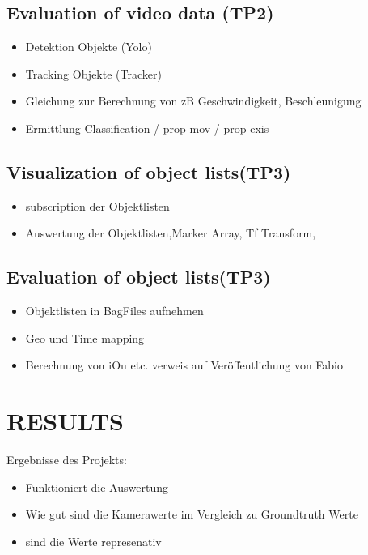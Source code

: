 \documentclass[letterpaper, 10 pt, conference]{ieeeconf}  %
\begin{document}
\subsection{Evaluation of video data (TP2)}

\begin{itemize}
\item Detektion Objekte (Yolo)
\item Tracking Objekte (Tracker)
\item Gleichung zur Berechnung von zB Geschwindigkeit, Beschleunigung
\item Ermittlung Classification / prop mov / prop exis

\end{itemize}

\subsection{Visualization of object lists(TP3)}

\begin{itemize}
\item subscription der Objektlisten
\item Auswertung der Objektlisten,Marker Array, Tf Transform, 



\end{itemize}

\subsection{Evaluation of object lists(TP3)}

\begin{itemize}
\item Objektlisten in BagFiles aufnehmen
\item Geo und Time mapping
\item Berechnung von iOu etc. verweis auf Veröffentlichung von Fabio




\end{itemize}

\section{RESULTS}

Ergebnisse des Projekts:
 
 \begin{itemize}
\item Funktioniert die Auswertung
\item Wie gut sind die Kamerawerte im Vergleich zu Groundtruth Werte
\item sind die Werte represenativ
\end{itemize}
\end{document}
